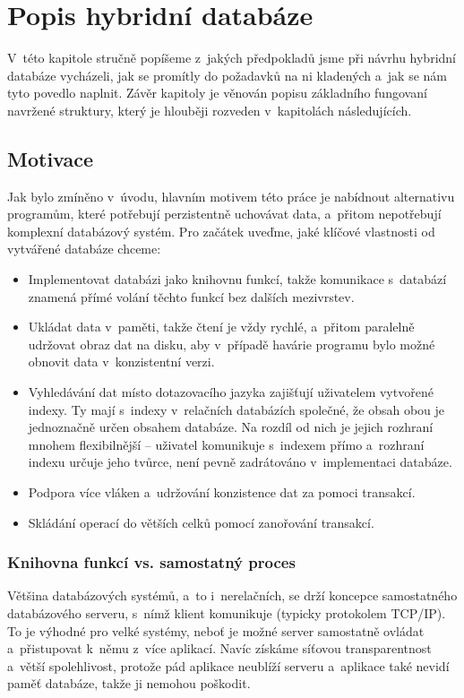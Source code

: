 \chapter{Popis hybridní databáze}
V~této kapitole stručně popíšeme z~jakých předpokladů jsme při návrhu hybridní
databáze vycházeli, jak se promítly do požadavků na ni kladených a~jak se
nám tyto povedlo naplnit. Závěr kapitoly je věnován popisu základního
fungovaní navržené struktury, který je hlouběji rozveden v~kapitolách následujících.

\section{Motivace}
Jak bylo zmíněno v~úvodu, hlavním motivem této práce je nabídnout alternativu
programům, které potřebují perzistentně uchovávat data, a~přitom nepotřebují
komplexní databázový systém. Pro začátek uveďme, jaké klíčové vlastnosti
od vytvářené databáze chceme:

\begin{itemize}
  \item Implementovat databázi jako knihovnu funkcí, takže komunikace
    s~databází znamená přímé volání těchto funkcí bez dalších mezivrstev.
  \item Ukládat data v~paměti, takže čtení je vždy rychlé, a~přitom paralelně
    udržovat obraz dat na disku, aby v~případě havárie programu bylo možné
    obnovit data v~konzistentní verzi.
  \item Vyhledávání dat místo dotazovacího jazyka zajišťují uživatelem vytvořené
    indexy. Ty mají s~indexy v~relačních databázích společné, že obsah obou je
    jednoznačně určen obsahem databáze. Na rozdíl od nich je jejich rozhraní mnohem
    flexibilnější -- uživatel komunikuje s~indexem přímo a~rozhraní indexu
    určuje jeho tvůrce, není pevně zadrátováno v~implementaci databáze.
  \item Podpora více vláken a~udržování konzistence dat za pomoci transakcí.
  \item Skládání operací do větších celků pomocí zanořování transakcí.
\end{itemize}

\subsection{Knihovna funkcí vs. samostatný proces}
Většina databázových systémů, a~to i~nerelačních, se drží koncepce samostatného
databázového serveru, s~nímž klient komunikuje (typicky protokolem TCP/IP).
To je výhodné pro velké systémy, neboť je možné server samostatně ovládat
a~přistupovat k~němu z~více aplikací. Navíc získáme síťovou transparentnost a~větší
spolehlivost, protože pád aplikace neublíží serveru a~aplikace také nevidí
paměť databáze, takže ji nemohou poškodit.

